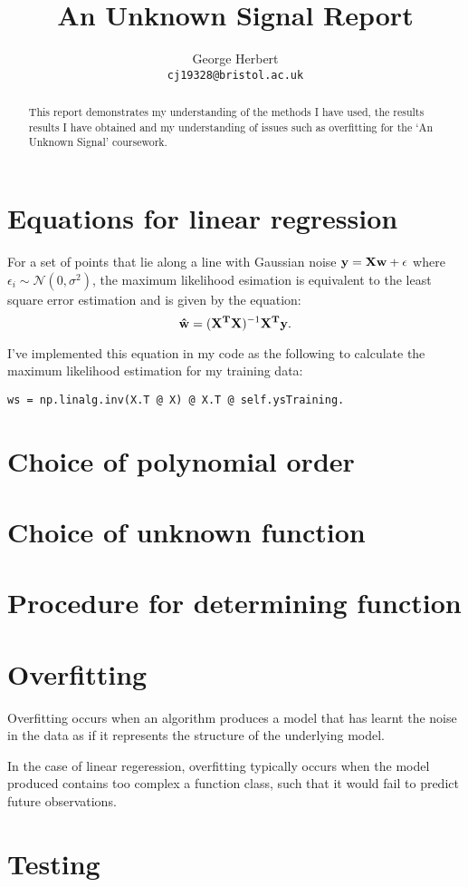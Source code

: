 \documentclass[onecolumn, 12pt, a4paper]{article}
\author{
  George Herbert\\
  \texttt{cj19328@bristol.ac.uk}
}
\title{An Unknown Signal Report}
\begin{document}
\maketitle

\begin{abstract}
    This report demonstrates my understanding of the methods I have 
    used, the results results I have obtained and my understanding
    of issues such as overfitting for the `An Unknown Signal'
    coursework.
\end{abstract}

\section{Equations for linear regression}

For a set of points that lie along a line with Gaussian noise 
$\vb{y} = \vb{X}\vb{w} + \vb{\epsilon}$ where $\epsilon_{i} \sim \mathcal{N}(0, \sigma^{2})$,
the maximum likelihood esimation is equivalent to the least square 
error estimation and is given by the equation:
\[
    \vb{\hat{w}} = (\vb{X^{T}}\vb{X})^{-1}\vb{X^{T}}\vb{y}.
\]

I've implemented this equation in my code as the following to calculate
the maximum likelihood estimation for my training data:
\begin{verbatim}
ws = np.linalg.inv(X.T @ X) @ X.T @ self.ysTraining.
\end{verbatim}

\section{Choice of polynomial order}

\section{Choice of unknown function}

\section{Procedure for determining function}

\section{Overfitting}

Overfitting occurs when an algorithm produces a model that has
learnt the noise in the data as if it represents the
structure of the underlying model.

In the case of linear regeression, overfitting typically occurs
when the model produced contains too complex a function class,
such that it would fail to predict future observations.


\section{Testing}
\end{document}
